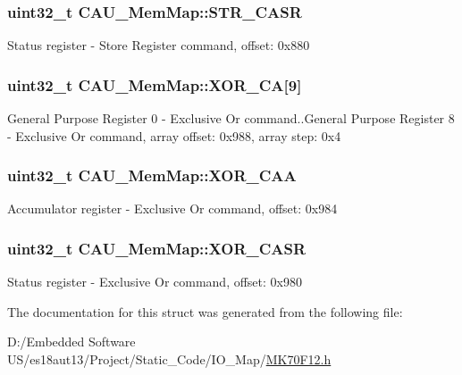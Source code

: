 \subsubsection[{S\+T\+R\+\_\+\+C\+A\+S\+R}]{\setlength{\rightskip}{0pt plus 5cm}uint32\+\_\+t C\+A\+U\+\_\+\+Mem\+Map\+::\+S\+T\+R\+\_\+\+C\+A\+S\+R}\label{struct_c_a_u___mem_map_ad90eef15bc61290af107c3d5871599a8}
Status register -\/ Store Register command, offset\+: 0x880 \hypertarget{struct_c_a_u___mem_map_acb520a0239533ff35af926264fd9a6a9}{}
\subsubsection[{X\+O\+R\+\_\+\+C\+A}]{\setlength{\rightskip}{0pt plus 5cm}uint32\+\_\+t C\+A\+U\+\_\+\+Mem\+Map\+::\+X\+O\+R\+\_\+\+C\+A\mbox{[}9\mbox{]}}\label{struct_c_a_u___mem_map_acb520a0239533ff35af926264fd9a6a9}
General Purpose Register 0 -\/ Exclusive Or command..General Purpose Register 8 -\/ Exclusive Or command, array offset\+: 0x988, array step\+: 0x4 \hypertarget{struct_c_a_u___mem_map_a5597e40ecdc9aaf07f342eea55467ff1}{}
\subsubsection[{X\+O\+R\+\_\+\+C\+A\+A}]{\setlength{\rightskip}{0pt plus 5cm}uint32\+\_\+t C\+A\+U\+\_\+\+Mem\+Map\+::\+X\+O\+R\+\_\+\+C\+A\+A}\label{struct_c_a_u___mem_map_a5597e40ecdc9aaf07f342eea55467ff1}
Accumulator register -\/ Exclusive Or command, offset\+: 0x984 \hypertarget{struct_c_a_u___mem_map_a9a390a748c987c883432ae79087640e2}{}
\subsubsection[{X\+O\+R\+\_\+\+C\+A\+S\+R}]{\setlength{\rightskip}{0pt plus 5cm}uint32\+\_\+t C\+A\+U\+\_\+\+Mem\+Map\+::\+X\+O\+R\+\_\+\+C\+A\+S\+R}\label{struct_c_a_u___mem_map_a9a390a748c987c883432ae79087640e2}
Status register -\/ Exclusive Or command, offset\+: 0x980 

The documentation for this struct was generated from the following file\+:\begin{DoxyCompactItemize}
\item 
D\+:/\+Embedded Software U\+S/es18aut13/\+Project/\+Static\+\_\+\+Code/\+I\+O\+\_\+\+Map/\hyperlink{_m_k70_f12_8h}{M\+K70\+F12.\+h}\end{DoxyCompactItemize}
